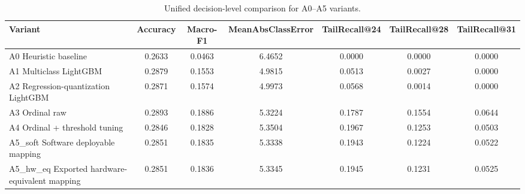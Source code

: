 \begin{table}[t]
\centering
\caption{Unified decision-level comparison for A0--A5 variants.}
\label{tab:unified_decision}
\setlength{\tabcolsep}{4pt}
\begin{tabular}{lcccccc}
\toprule
Variant & Accuracy & Macro-F1 & MeanAbsClassError & TailRecall@24 & TailRecall@28 & TailRecall@31 \\
\midrule
A0 Heuristic baseline & 0.2633 & 0.0463 & 6.4652 & 0.0000 & 0.0000 & 0.0000 \\
A1 Multiclass LightGBM & 0.2879 & 0.1553 & 4.9815 & 0.0513 & 0.0027 & 0.0000 \\
A2 Regression-quantization LightGBM & 0.2871 & 0.1574 & 4.9973 & 0.0568 & 0.0014 & 0.0000 \\
A3 Ordinal raw & 0.2893 & 0.1886 & 5.3224 & 0.1787 & 0.1554 & 0.0644 \\
A4 Ordinal + threshold tuning & 0.2846 & 0.1828 & 5.3504 & 0.1967 & 0.1253 & 0.0503 \\
A5_soft Software deployable mapping & 0.2851 & 0.1835 & 5.3338 & 0.1943 & 0.1224 & 0.0522 \\
A5_hw_eq Exported hardware-equivalent mapping & 0.2851 & 0.1836 & 5.3345 & 0.1945 & 0.1231 & 0.0525 \\
\bottomrule
\end{tabular}
\end{table}
